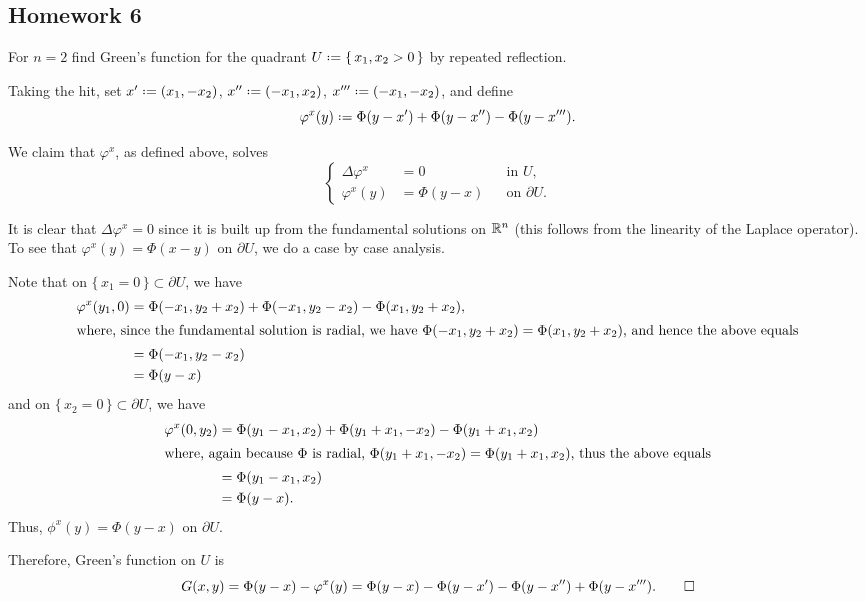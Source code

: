 \subsection{Homework 6}
\begin{problem}
  For \(n=2\) find Green's function for the quadrant
  \(U\defeq\{\,x_1,x_2>0\,\}\) by repeated reflection.
\end{problem}
\begin{solution}
  Taking the hit, set \(x'\defeq(x_1,-x_2)\), \(x''\defeq(-x_1,x_2)\),
  \(x'''\defeq(-x_1,-x_2)\), and define
  \begin{equation}
    \label{eq:6:corrector}
    \varphi^x(y)\defeq\Phi(y-x')+\Phi(y-x'')-\Phi(y-x''').
  \end{equation}

  We claim that \(\varphi^x\), as defined above, solves
  \[
    \left\{
      \begin{aligned}
        \Delta\varphi^x&=0&&\text{in \(U\),}\\
        \varphi^x(y)&=\Phi(y-x)&&\text{on \(\partial U\).}
      \end{aligned}
    \right.
  \]

  It is clear that \(\Delta\varphi^x=0\) since it is built up from the
  fundamental solutions on \(\mathbb{R}^n\) (this follows from the linearity of
  the Laplace operator). To see that \(\varphi^x(y)=\Phi(x-y)\) on
  \(\partial U\), we do a case by case analysis.

  Note that on \(\{\,x_1=0\,\}\subset\partial U\), we have
  \begin{align*}
    \varphi^x(y_1,0)
    &=\Phi(-x_1,y_2+x_2)+\Phi(-x_1,y_2-x_2)-\Phi(x_1,y_2+x_2),\\
    \intertext{where, since the fundamental solution is radial, we have
    \(\Phi(-x_1,y_2+x_2)=\Phi(x_1,y_2+x_2)\), and hence the above equals}
    &=\Phi(-x_1,y_2-x_2)\\
    &=\Phi(y-x)
  \end{align*}
  and on \(\{\,x_2=0\,\}\subset\partial U\), we have
  \begin{align*}
    \varphi^x(0,y_2)
    &=\Phi(y_1-x_1,x_2)+\Phi(y_1+x_1,-x_2)-\Phi(y_1+x_1,x_2)\\
    \intertext{where, again because \(\Phi\) is radial,
    \(\Phi(y_1+x_1,-x_2)=\Phi(y_1+x_1,x_2)\), thus the above equals}
    &=\Phi(y_1-x_1,x_2)\\
    &=\Phi(y-x).
  \end{align*}
  Thus, \(\phi^x(y)=\Phi(y-x)\) on \(\partial U\).

  Therefore, Green's function on \(U\) is
  \[
    G(x,y)
    =\Phi(y-x)-\varphi^x(y)%
    =\Phi(y-x)-\Phi(y-x')-\Phi(y-x'')+\Phi(y-x''').%
    \qedhere
  \]
\end{solution}

